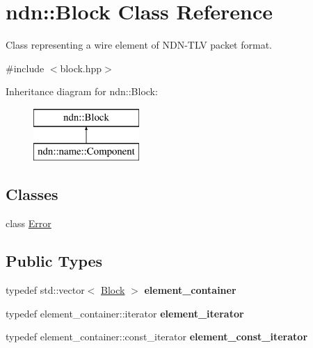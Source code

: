 \hypertarget{classndn_1_1Block}{}\section{ndn\+:\+:Block Class Reference}
\label{classndn_1_1Block}


Class representing a wire element of N\+D\+N-\/\+T\+LV packet format.  




{\ttfamily \#include $<$block.\+hpp$>$}

Inheritance diagram for ndn\+:\+:Block\+:\begin{figure}[H]
\begin{center}
\leavevmode
\includegraphics[height=2.000000cm]{classndn_1_1Block}
\end{center}
\end{figure}
\subsection*{Classes}
\begin{DoxyCompactItemize}
\item 
class \hyperlink{classndn_1_1Block_1_1Error}{Error}
\end{DoxyCompactItemize}
\subsection*{Public Types}
\begin{DoxyCompactItemize}
\item 
typedef std\+::vector$<$ \hyperlink{classndn_1_1Block}{Block} $>$ {\bfseries element\+\_\+container}\hypertarget{classndn_1_1Block_a7c5cffe0b8268f9774c3ff38e7118c0d}{}\label{classndn_1_1Block_a7c5cffe0b8268f9774c3ff38e7118c0d}

\item 
typedef element\+\_\+container\+::iterator {\bfseries element\+\_\+iterator}\hypertarget{classndn_1_1Block_afe0edbb9359c13ecb792eb04ac078183}{}\label{classndn_1_1Block_afe0edbb9359c13ecb792eb04ac078183}

\item 
typedef element\+\_\+container\+::const\+\_\+iterator {\bfseries element\+\_\+const\+\_\+iterator}\hypertarget{classndn_1_1Block_a058e29abe602859b6691dc5154076f6c}{}\label{classndn_1_1Block_a058e29abe602859b6691dc5154076f6c}

\end{DoxyCompactItemize}
